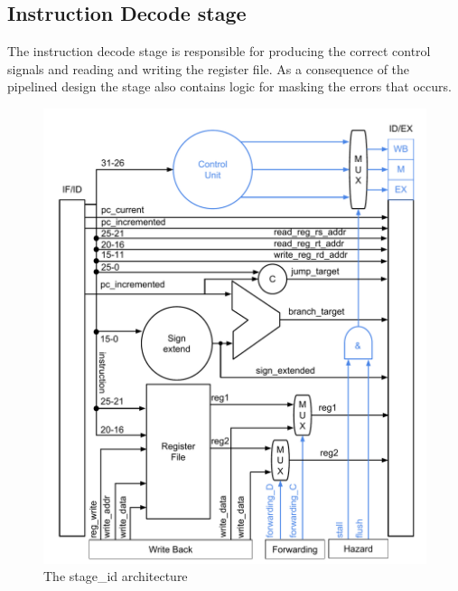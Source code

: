 \subsection{Instruction Decode stage} 
\label{section:stage_id}

The instruction decode stage is responsible for producing the correct control signals and reading and writing the register file. As a consequence of the pipelined design the stage also contains logic for masking the errors that occurs.

\begin{figure}[h]
        \centering\includegraphics[scale=0.5]{figures/stage_id}
        \caption{The stage\_id architecture}
         \label{fig:stage_id}
\end{figure}
\FloatBarrier

